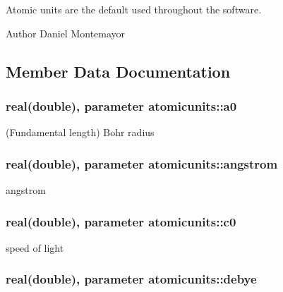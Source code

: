Atomic units are the default used throughout the software. \begin{DoxyAuthor}{Author}
Daniel Montemayor 
\end{DoxyAuthor}


\subsection{Member Data Documentation}
\hypertarget{classatomicunits_aa4859dbb9e7739ae603b78d9f2c58f93}{
\subsubsection[{a0}]{\setlength{\rightskip}{0pt plus 5cm}real(double), parameter atomicunits\-::a0}}\label{classatomicunits_aa4859dbb9e7739ae603b78d9f2c58f93}


(Fundamental length) Bohr radius 

\hypertarget{classatomicunits_a618f9dcd7de9b9ddb53af5bd4f1095c6}{
\subsubsection[{angstrom}]{\setlength{\rightskip}{0pt plus 5cm}real(double), parameter atomicunits\-::angstrom}}\label{classatomicunits_a618f9dcd7de9b9ddb53af5bd4f1095c6}


angstrom 

\hypertarget{classatomicunits_ae35b35bfa15b571da842371a32dcb2e6}{
\subsubsection[{c0}]{\setlength{\rightskip}{0pt plus 5cm}real(double), parameter atomicunits\-::c0}}\label{classatomicunits_ae35b35bfa15b571da842371a32dcb2e6}


speed of light 

\hypertarget{classatomicunits_af82c72bfababde1e5da6ac04a43b8570}{
\subsubsection[{debye}]{\setlength{\rightskip}{0pt plus 5cm}real(double), parameter atomicunits\-::debye}}\label{classatomicunits_af82c72bfababde1e5da6ac04a43b8570}


